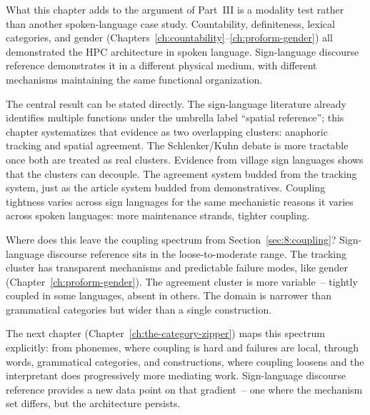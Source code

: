 What this chapter adds to the argument of Part~III is a modality test rather than another spoken-language case study. Countability, definiteness, lexical categories, and gender (Chapters~\ref{ch:countability}--\ref{ch:proform-gender}) all demonstrated the HPC architecture in spoken language. Sign-language discourse reference demonstrates it in a different physical medium, with different mechanisms maintaining the same functional organization.

The central result can be stated directly. The sign-language literature already identifies multiple functions under the umbrella label \enquote{spatial reference}; this chapter systematizes that evidence as two overlapping clusters: anaphoric tracking and spatial agreement. The Schlenker/Kuhn debate is more tractable once both are treated as real clusters. Evidence from village sign languages shows that the clusters can decouple. The agreement system budded from the tracking system, just as the article system budded from demonstratives. Coupling tightness varies across sign languages for the same mechanistic reasons it varies across spoken languages: more maintenance strands, tighter coupling.

Where does this leave the coupling spectrum from Section~\ref{sec:8:coupling}? Sign-language discourse reference sits in the loose-to-moderate range. The tracking cluster has transparent mechanisms and predictable failure modes, like gender (Chapter~\ref{ch:proform-gender}). The agreement cluster is more variable~-- tightly coupled in some languages, absent in others. The domain is narrower than grammatical categories but wider than a single construction.

The next chapter (Chapter~\ref{ch:the-category-zipper}) maps this spectrum explicitly: from phonemes, where coupling is hard and failures are local, through words, grammatical categories, and constructions, where coupling loosens and the interpretant does progressively more mediating work. Sign-language discourse reference provides a new data point on that gradient~-- one where the mechanism set differs, but the architecture persists.
